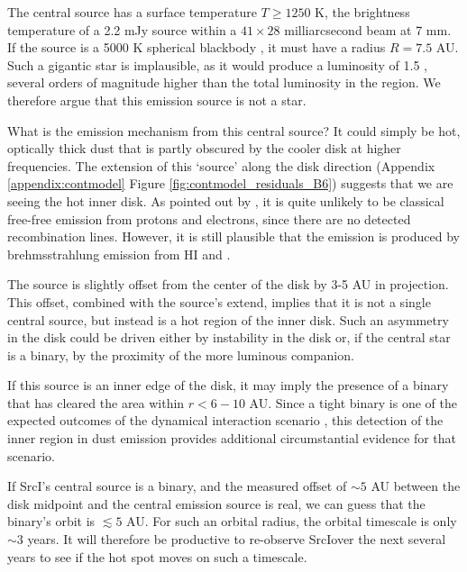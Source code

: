 \documentclass[twocolumn]{aastex61}
\newcommand{\sourcei}{SrcI}
\begin{document}
The central source has a surface temperature $T\geq1250$ K, the brightness
temperature of a 2.2 mJy source within a $41\times28$ milliarcsecond beam at 7
mm.  If the source is a 5000 K spherical blackbody \citep[e.g.,][]{Testi2010a},
it must have a radius $R=7.5$ AU.  Such a gigantic star is implausible, as it
would produce a luminosity of 1.5 \lsun, several orders of magnitude
higher than the total luminosity in the region.  We therefore argue
that this emission source is not a star.

What is the emission mechanism from this central source?
It could simply be hot, optically thick dust that is partly obscured by the
cooler disk at higher frequencies.  The  extension of this `source' along the
disk direction (Appendix \ref{appendix:contmodel} Figure
\ref{fig:contmodel_residuals_B6}) suggests that we are
seeing the hot inner disk.  As pointed out by \citet{Plambeck2016a}, it is
quite unlikely to be classical free-free emission from protons
and electrons, since there are no detected
recombination lines.  However, it is still plausible that the emission is
produced by brehmsstrahlung emission from HI and \hh
\citep{Reid2007a,Baez-Rubio2018a}.

The source is slightly offset from the center of the disk by 3-5 AU in
projection.  This offset, combined with the source's extend, implies that it is
not a single central source, but
instead is a hot region of the inner disk.  Such an asymmetry in the disk could
be driven either by instability in the disk or, if the central star is a
binary, by the proximity of the more luminous companion.

If this source is an inner edge of the disk, it may imply the presence of a
binary that has cleared the area within $r<6-10$ AU.  Since a tight binary is
one of the expected outcomes of the dynamical interaction scenario
\citep{Goddi2011b}, this
detection of the inner region in dust emission provides additional
circumstantial evidence for that scenario.

If SrcI's central source is a binary, and the measured offset of $\sim5$ AU
between the disk midpoint and the central emission source is real, we can guess
that the binary's orbit is $\lesssim5$ AU.  For such an orbital radius, the
orbital timescale is only $\sim3$ years.   It will therefore be productive to
re-observe \sourcei over the next several years to see if the hot spot moves on
such a timescale.
\end{document}

